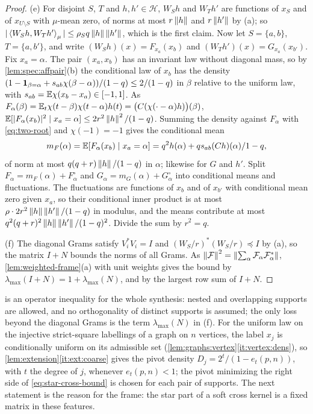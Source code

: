 \begin{proof}
(e) For disjoint $S$, $T$ and $h,h'\in\mathcal H$, $W_Sh$ and $W_Th'$ are functions of
$x_S$ and of $x_{U\setminus S}$ with $\mu$-mean zero, of norms at most $r\left\|h\right\|$ and
$r\left\|h'\right\|$ by (a); so $|\left\langle W_Sh,W_Th'\right\rangle_\mu|\le\rho_Sq\left\|h\right\|\left\|h'\right\|$, which is the
first claim. Now let
$S=\{a,b\}$, $T=\{a,b'\}$, and write $(W_Sh)(x)=F_{x_a}(x_b)$ and
$(W_Th')(x)=G_{x_a}(x_{b'})$. Fix $x_a=\alpha$. The pair $(x_a,x_b)$ has an invariant law
without diagonal mass, so by \cref{lem:spec:affpair}(b) the conditional law of $x_b$
has the density $(1-\mathbf 1_{\beta=\alpha}+s_{ab}\chi(\beta-\alpha))/(1-q)\le2/(1-q)$ in $\beta$
relative to the uniform law, with $s_{ab}=\mathbb E\chi(x_b-x_a)\in[-1,1]$. As
$F_\alpha(\beta)=\mathbb E_t\chi(t-\beta)\chi(t-\alpha)h(t)=\big(C(\chi(\cdot-\alpha)h)\big)(\beta)$,
$\mathbb E[|F_\alpha(x_b)|^2\mid x_a=\alpha]\le2r^2\left\|h\right\|^2/(1-q)$. Summing the density against
$F_\alpha$ with \eqref{eq:two-root} and $\chi(-1)=-1$ gives the conditional mean
\[
  m_F(\alpha)=\mathbb E[F_\alpha(x_b)\mid x_a=\alpha]
  =q^2h(\alpha)+qs_{ab}(Ch)(\alpha)/1-q,
\]
of norm at most $q(q+r)\left\|h\right\|/(1-q)$ in $\alpha$; likewise for $G$ and $h'$. Split
$F_\alpha=m_F(\alpha)+F^\circ_\alpha$ and $G_\alpha=m_G(\alpha)+G^\circ_\alpha$ into conditional means
and fluctuations. The fluctuations are functions of $x_b$ and of
$x_{b'}$ with conditional mean zero given $x_a$, so their conditional inner product is
at most $\rho\cdot2r^2\left\|h\right\|\left\|h'\right\|/(1-q)$ in modulus, and the means contribute at most
$q^2(q+r)^2\left\|h\right\|\left\|h'\right\|/(1-q)^2$. Divide the sum by $r^2=q$.

(f) The diagonal Grams satisfy $V_i^*V_i=I$ and $(W_S/r)^*(W_S/r)\preceq I$ by (a), so the
matrix $I+N$ bounds the norms of all Grams. As
$\left\|\mathcal F\right\|^2=\left\|\sum_\alpha\mathcal F_\alpha\mathcal F_\alpha^*\right\|$, \cref{lem:weighted-frame}(a)
with unit weights gives the bound by $\lambda_{\max}(I+N)=1+\lambda_{\max}(N)$, and by the
largest row sum of $I+N$.
\end{proof}

 is an operator inequality for the whole synthesis: nested
and overlapping supports are allowed, and no orthogonality of distinct supports is
assumed; the only loss beyond the diagonal Grams is the term $\lambda_{\max}(N)$ in \textup{(f)}. For the uniform law on the
injective strict-square labellings of a graph on $n$ vertices, the label $x_j$ is
conditionally uniform on its admissible set (\cref{lem:graphs:vertex}\ref{it:vertex:dens}),
so \cref{lem:extension}\ref{it:ext:coarse} gives the pivot density
$D_j=2^t/(1-e_t(p,n))$, with $t$ the degree of $j$, whenever $e_t(p,n)<1$; the pivot minimizing the right side of \eqref{eq:star-cross-bound} is chosen for each pair of supports. The next statement is the reason for the
frame: the star part of a soft cross kernel is a fixed matrix in these features.


